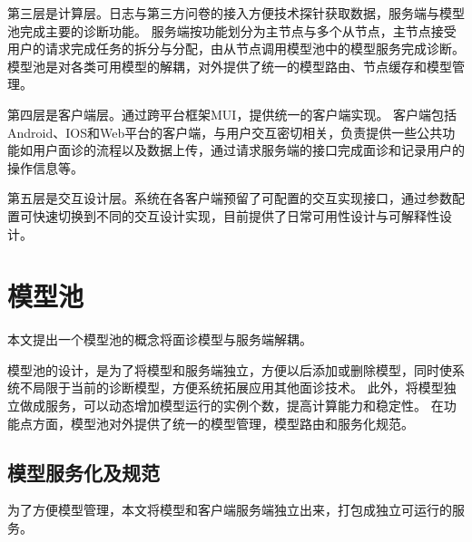 第三层是计算层。日志与第三方问卷的接入方便技术探针获取数据，服务端与模型池完成主要的诊断功能。
服务端按功能划分为主节点与多个从节点，主节点接受用户的请求完成任务的拆分与分配，由从节点调用模型池中的模型服务完成诊断。
模型池是对各类可用模型的解耦，对外提供了统一的模型路由、节点缓存和模型管理。

第四层是客户端层。通过跨平台框架MUI，提供统一的客户端实现。
客户端包括Android、IOS和Web平台的客户端，与用户交互密切相关，负责提供一些公共功能如用户面诊的流程以及数据上传，通过请求服务端的接口完成面诊和记录用户的操作信息等。

第五层是交互设计层。系统在各客户端预留了可配置的交互实现接口，通过参数配置可快速切换到不同的交互设计实现，目前提供了日常可用性设计与可解释性设计。


%

\section{模型池}
\label{sec:model_pool}
本文提出一个模型池的概念将面诊模型与服务端解耦。

模型池的设计，是为了将模型和服务端独立，方便以后添加或删除模型，同时使系统不局限于当前的诊断模型，方便系统拓展应用其他面诊技术。
此外，将模型独立做成服务，可以动态增加模型运行的实例个数，提高计算能力和稳定性。
在功能点方面，模型池对外提供了统一的模型管理，模型路由和服务化规范。

\subsection{模型服务化及规范}
为了方便模型管理，本文将模型和客户端服务端独立出来，打包成独立可运行的服务。

